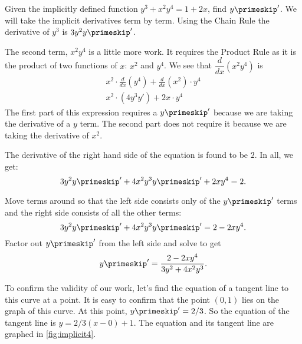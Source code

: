 \begin{example}\label{ex_implicit3}
Given the implicitly defined function $y^3+x^2y^4=1+2x$, find $y\primeskip'$.
\solution
We will take the implicit derivatives term by term. Using the Chain Rule the derivative of $y^3$ is $3y^2 y\primeskip'$.

The second term, $x^2y^4$ is a little more work. It requires the Product Rule as it is the product of two functions of $x$: $x^2$ and $y^4$. We see that $\dfrac{d}{dx}(x^2y^4)$ is
\begin{gather*}
x^2 \cdot \frac{d}{dx}(y^4) + \frac{d}{dx}(x^2) \cdot y^4 \\
x^2 \cdot (4y^3y') + 2x \cdot y^4 
\end{gather*}
The first part of this expression requires a $y\primeskip'$ because we are taking the derivative of a $y$ term. The second part does not require it because we are taking the derivative of $x^2$.

The derivative of the right hand side of the equation is found to be $2$. In all, we get:
\[3y^2y\primeskip' + 4x^2y^3y\primeskip' + 2xy^4 = 2.\]

Move terms around so that the left side consists only of the $y\primeskip'$ terms and the right side consists of all the other terms:
\[3y^2y\primeskip' + 4x^2y^3y\primeskip' = 2-2xy^4.\]
Factor out $y\primeskip'$ from the left side and solve to get
\[y\primeskip' = \frac{2-2xy^4}{3y^2+4x^2y^3}.\]

To confirm the validity of our work, let's find the equation of a tangent line to this curve at a point. It is easy to confirm that the point $(0,1)$ lies on the graph of this curve. At this point, $y\primeskip' = 2/3$. So the equation of the tangent line is $y = 2/3(x-0)+1$. The equation and its tangent line are graphed in \autoref{fig:implicit4}.


\end{example}

